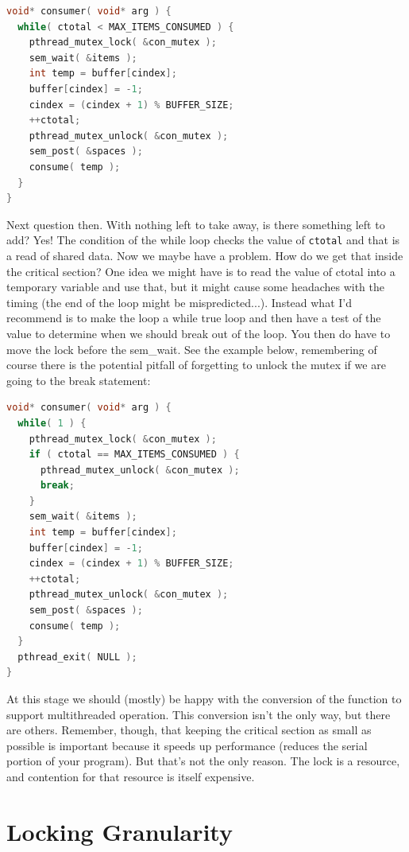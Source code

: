 \documentclass[a4paper]{report}
\begin{document}
\begin{lstlisting}[language=C]
void* consumer( void* arg ) { 
  while( ctotal < MAX_ITEMS_CONSUMED ) {
    pthread_mutex_lock( &con_mutex );
    sem_wait( &items );
    int temp = buffer[cindex];
    buffer[cindex] = -1;
    cindex = (cindex + 1) % BUFFER_SIZE;
    ++ctotal;
    pthread_mutex_unlock( &con_mutex );
    sem_post( &spaces );
    consume( temp );
  }
}
\end{lstlisting}

Next question then. With nothing left to take away, is there something left to add? Yes! The condition of the while loop checks the value of \texttt{ctotal} and that is a read of shared data. Now we maybe have a problem. How do we get that inside the critical section? One idea we might have is to read the value of ctotal into a temporary variable and use that, but it might cause some headaches with the timing (the end of the loop might be mispredicted...).  Instead what I'd recommend is to make the loop a while true loop and then have a test of the value to determine when we should break out of the loop. You then do have to move the lock before the sem\_wait. See the example below, remembering of course there is the potential pitfall of forgetting to unlock the mutex if we are going to the break statement:

\begin{lstlisting}[language=C]
void* consumer( void* arg ) { 
  while( 1 ) { 
    pthread_mutex_lock( &con_mutex );  
    if ( ctotal == MAX_ITEMS_CONSUMED ) {
      pthread_mutex_unlock( &con_mutex );
      break;
    }   
    sem_wait( &items );
    int temp = buffer[cindex];
    buffer[cindex] = -1; 
    cindex = (cindex + 1) % BUFFER_SIZE;
    ++ctotal;
    pthread_mutex_unlock( &con_mutex );
    sem_post( &spaces );
    consume( temp );
  }
  pthread_exit( NULL );
}
\end{lstlisting}

At this stage we should (mostly) be happy with the conversion of the function to support multithreaded operation. This conversion isn't the only way, but there are others. Remember, though, that keeping the critical section as small as possible is important because it speeds up performance (reduces the serial portion of your program). But that's not the only reason. The lock is a resource, and contention for that resource is itself expensive.

\section*{Locking Granularity}
\end{document}

